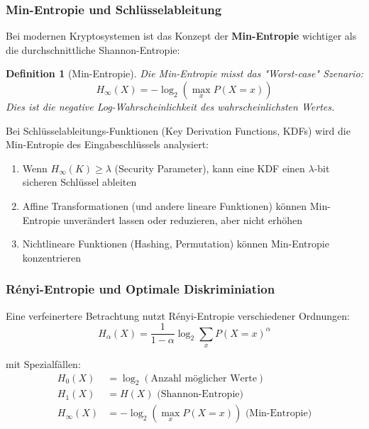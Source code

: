 ﻿\documentclass[12pt,a4paper]{article}
\newtheorem{definition}{Definition}
\begin{document}
	\subsubsection{Min-Entropie und Schlüsselableitung}
	
	Bei modernen Kryptosystemen ist das Konzept der \textbf{Min-Entropie} wichtiger als die durchschnittliche Shannon-Entropie:
	
	\begin{definition}[Min-Entropie]
		Die Min-Entropie misst das "Worst-case" Szenario:
		\begin{equation}
			H_\infty(X) = -\log_2(\max_x P(X = x))
		\end{equation}
		Dies ist die negative Log-Wahrscheinlichkeit des wahrscheinlichsten Wertes.
	\end{definition}
	
	Bei Schlüsselableitungs-Funktionen (Key Derivation Functions, KDFs) wird die Min-Entropie des Eingabeschlüssels analysiert:
	\begin{enumerate}
		\item Wenn $H_\infty(K) \geq \lambda$ (Security Parameter), kann eine KDF einen $\lambda$-bit sicheren Schlüssel ableiten
		\item Affine Transformationen (und andere lineare Funktionen) können Min-Entropie unverändert lassen oder reduzieren, aber nicht erhöhen
		\item Nichtlineare Funktionen (Hashing, Permutation) können Min-Entropie konzentrieren
	\end{enumerate}
	
	\subsubsection{Rényi-Entropie und Optimale Diskriminiation}
	
	Eine verfeinertere Betrachtung nutzt Rényi-Entropie verschiedener Ordnungen:
	\begin{equation}
		H_\alpha(X) = \frac{1}{1-\alpha} \log_2 \sum_x P(X=x)^\alpha
	\end{equation}
	
	mit Spezialfällen:
	\begin{align}
		H_0(X) &= \log_2(\text{Anzahl möglicher Werte}) \\
		H_1(X) &= H(X) \text{ (Shannon-Entropie)} \\
		H_\infty(X) &= -\log_2(\max_x P(X=x)) \text{ (Min-Entropie)}
	\end{align}
	
\end{document}
